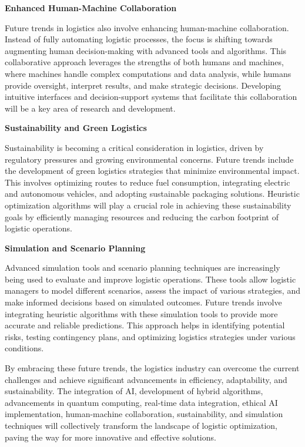 \documentclass[
]{article}
\begin{document}
\textbf{Enhanced Human-Machine Collaboration}

Future trends in logistics also involve enhancing human-machine collaboration. Instead of fully automating logistic processes, the focus is shifting towards augmenting human decision-making with advanced tools and algorithms. This collaborative approach leverages the strengths of both humans and machines, where machines handle complex computations and data analysis, while humans provide oversight, interpret results, and make strategic decisions. Developing intuitive interfaces and decision-support systems that facilitate this collaboration will be a key area of research and development.

\textbf{Sustainability and Green Logistics}

Sustainability is becoming a critical consideration in logistics, driven by regulatory pressures and growing environmental concerns. Future trends include the development of green logistics strategies that minimize environmental impact. This involves optimizing routes to reduce fuel consumption, integrating electric and autonomous vehicles, and adopting sustainable packaging solutions. Heuristic optimization algorithms will play a crucial role in achieving these sustainability goals by efficiently managing resources and reducing the carbon footprint of logistic operations.

\textbf{Simulation and Scenario Planning}

Advanced simulation tools and scenario planning techniques are increasingly being used to evaluate and improve logistic operations. These tools allow logistic managers to model different scenarios, assess the impact of various strategies, and make informed decisions based on simulated outcomes. Future trends involve integrating heuristic algorithms with these simulation tools to provide more accurate and reliable predictions. This approach helps in identifying potential risks, testing contingency plans, and optimizing logistics strategies under various conditions.

By embracing these future trends, the logistics industry can overcome the current challenges and achieve significant advancements in efficiency, adaptability, and sustainability. The integration of AI, development of hybrid algorithms, advancements in quantum computing, real-time data integration, ethical AI implementation, human-machine collaboration, sustainability, and simulation techniques will collectively transform the landscape of logistic optimization, paving the way for more innovative and effective solutions.
\end{document}
